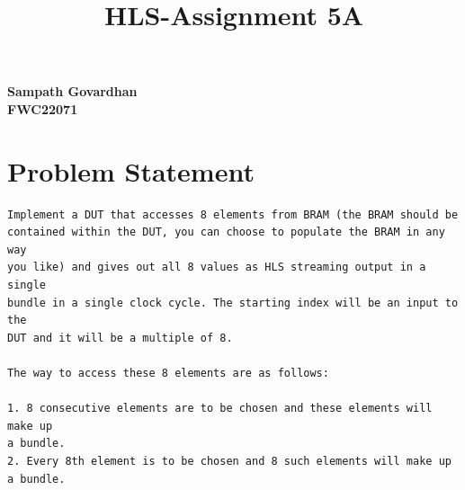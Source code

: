 \documentclass{article}
\title{
HLS-Assignment 5A
}
\begin{document}
\maketitle
\hfill \textbf{Sampath Govardhan} \\
\null \hfill \textbf{FWC22071}\\

\section{Problem Statement}
\begin{lstlisting}
Implement a DUT that accesses 8 elements from BRAM (the BRAM should be 
contained within the DUT, you can choose to populate the BRAM in any way
you like) and gives out all 8 values as HLS streaming output in a single 
bundle in a single clock cycle. The starting index will be an input to the 
DUT and it will be a multiple of 8.

The way to access these 8 elements are as follows:

1. 8 consecutive elements are to be chosen and these elements will make up 
a bundle.
2. Every 8th element is to be chosen and 8 such elements will make up a bundle.


\end{lstlisting}
\vspace{10cm}
\end{document}
